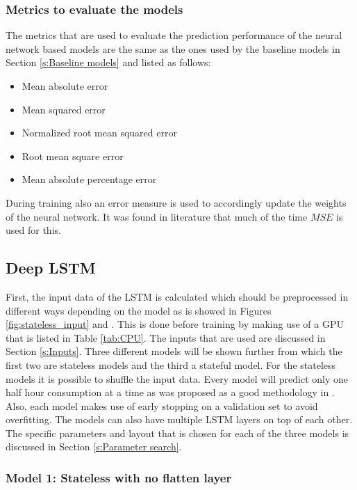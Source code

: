 \subsubsection{Metrics to evaluate the models}
The metrics that are used to evaluate the prediction performance of the  neural network based models are the same as the ones used by the baseline models in Section \ref{s:Baseline models} and listed as follows:
\begin{itemize}
	\item Mean absolute error
	\item Mean squared error
	\item Normalized root mean squared error
	\item Root mean square error
	\item Mean absolute percentage error
\end{itemize}

During training also an error measure is used to accordingly update the weights of the neural network. It was found in literature that much of the time $ MSE $ is used for this.


\subsection{Deep LSTM}\label{s:LSTM_implementation}
First, the input data of the LSTM is calculated which should be preprocessed in different ways depending on the model as is showed in Figures \ref{fig:stateless_input} and \label{fig:stateful_input}. This is done before training by making use of a GPU that is listed in Table \ref{tab:CPU}. The inputs that are used are discussed in Section \ref{s:Inputs}. Three different models will be shown further from which the first two are stateless models and the third a stateful model. For the stateless models it is possible to shuffle the input data. Every model will predict only one half hour consumption at a time as was proposed as a good methodology in \cite{ANNRNN}. Also, each model makes use of early stopping on a validation set to avoid overfitting. The models can also have multiple LSTM layers on top of each other. The specific parameters and layout that is chosen for each of the three models is discussed in Section \ref{s:Parameter search}.

\subsubsection{Model 1: Stateless with no flatten layer}\label{Model1}

